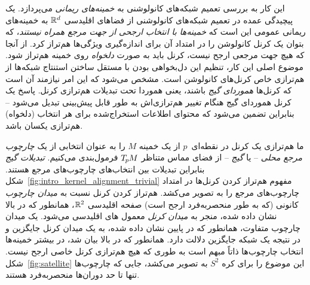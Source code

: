 این کار به بررسی تعمیم شبکه‌های کانولوشنی به \emph{خمینه‌های ریمانی} می‌پردازد.
یک پیچیدگی عمده در تعمیم شبکه‌های کانولوشنی از فضاهای اقلیدسی $\mathbb{R}^d$ به خمینه‌های ریمانی عمومی این است که \emph{خمینه‌ها با انتخاب ارجحی از جهت مرجع همراه نیستند}، که بتوان یک کرنل کانولوشن را در امتداد آن برای اندازه‌گیری ویژگی‌ها هم‌تراز کرد.
از آنجا که هیچ جهت مرجعی ارجح نیست، کرنل باید به صورت \emph{دلخواه} روی خمینه هم‌تراز شود.
موضوع اصلی این کار، تنظیم این دل‌بخواهی بودن با مستقل ساختن استنتاج شبکه‌ها از هم‌ترازی خاص کرنل‌های کانولوشن است.
مشخص می‌شود که این امر نیازمند آن است که کرنل‌ها \emph{هموردای گیج} باشند، یعنی هموردا تحت تبدیلات هم‌ترازی کرنل.
پاسخ یک کرنل هموردای گیج هنگام تغییر هم‌ترازی‌اش به طور قابل پیش‌بینی تبدیل می‌شود
-- بنابراین تضمین می‌شود که محتوای اطلاعات استخراج‌شده برای هر انتخاب (دلخواه) هم‌ترازی یکسان باشد.


ما هم‌ترازی یک کرنل در نقطه‌ای~$p$ از یک خمینه $M$ را به عنوان انتخابی از یک \emph{چارچوب مرجع محلی} -- یا \emph{گیج} -- از فضای مماس متناظر $T_{\mkern-1.5mu p}\mkern-.5muM$ فرمول‌بندی می‌کنیم.
\emph{تبدیلات گیج} بنابراین تبدیلات بین انتخاب‌های چارچوب‌های مرجع هستند.
شکل~\ref{fig:intro_kernel_alignment_trivial} مفهوم هم‌تراز کردن کرنل‌ها در امتداد چارچوب‌های مرجع را به تصویر می‌کشد.
هم‌تراز کردن کرنل نسبت به \emph{میدان چارچوب} کانونی (که به طور منحصربه‌فرد ارجح است) صفحه اقلیدسی $\mathbb{R}^2$، همانطور که در بالا نشان داده شده، منجر به \emph{میدان کرنل} معمول \CNN{}های اقلیدسی می‌شود.
یک میدان چارچوب متفاوت، همانطور که در پایین نشان داده شده، به یک میدان کرنل جایگزین و در نتیجه یک شبکه جایگزین دلالت دارد.
همانطور که در بالا بیان شد، در بیشتر خمینه‌ها انتخاب چارچوب‌ها ذاتاً مبهم است به طوری که هیچ هم‌ترازی کرنل خاصی ارجح نیست.
شکل~\ref{fig:satellite} این موضوع را برای کره $S^2$ به تصویر می‌کشد، جایی که چارچوب‌ها تنها تا حد دوران‌ها منحصربه‌فرد هستند.


